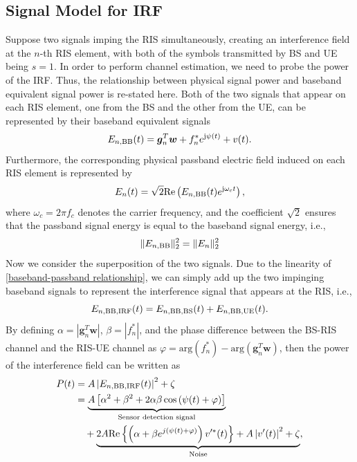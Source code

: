\documentclass[12pt,draftclsnofoot,journal,onecolumn]{IEEEtran}
\theoremstyle{nonumberplain}
\def \arg {\text{arg}}
\begin{document}
\subsection{Signal Model for IRF}
\label{Models for IRFs}
    Suppose two signals imping the RIS simultaneously, creating an interference field at the $n$-th RIS element, with both of the symbols transmitted by \ac{BS} and \ac{UE} being $s=1$. In order to perform channel estimation, we need to probe the power of the \ac{IRF}. Thus, the relationship between physical signal power and baseband equivalent signal power is re-stated here. Both of the two signals that appear on each RIS element, one from the \ac{BS} and the other from the \ac{UE}, can be represented by their baseband equivalent signals
    \begin{equation}
    \label{interference}
    E_{n,{\rm BB}}(t)=\bm g_{n}^{T}\bm w+f_{n}^{*}e^{{\rm j}\psi (t)}+v(t).
    \end{equation}
    Furthermore, the corresponding physical passband electric field induced on each RIS element is represented by 
    \begin{equation}
        E_{n}(t) = \sqrt{2} {\rm Re}\left( E_{n,{\rm BB}}(t)e^{{\rm j}\omega_c t} \right),
        \label{baseband-passband relationship}
    \end{equation}
    where $\omega_c = 2\pi f_c$ denotes the carrier frequency, and the coefficient $\sqrt{2}$ ensures that the passband signal energy is equal to the baseband signal energy, i.e., 
    \begin{equation}
        \lVert E_{n, {\rm BB}}\rVert_2^2 = \lVert E_{n}\rVert_2^2
    \end{equation}
    Now we consider the superposition of the two signals. Due to the linearity of \eqref{baseband-passband relationship}, we can simply add up the two impinging baseband signals to represent the interference signal that appears at the RIS, i.e., 
    \begin{equation}
        E_{n,{\rm BB, IRF}}(t) = E_{n, {\rm BB, BS}}(t)+E_{n,{\rm BB, UE}}(t).
    \end{equation}
    By defining $\alpha = \left\vert\bm g_{n}^{T}\bm w\right\vert$, $\beta = \left\vert f_{n}^{*}\right \vert$, and the phase difference between the \ac{BS}-\ac{RIS} channel and the \ac{RIS}-\ac{UE} channel as $\varphi = \arg\left(f_{n}^{*}\right)-\arg\left(\bm g_{n}^{T}\bm w\right)$, then the power of the interference field can be written as
    \begin{equation}
        \label{eqn:power of interference}
        \begin{aligned}
            P(t)&=A \left| E_{n, {\rm BB, IRF}} (t)\right |^{2}+\zeta\\
            &=\underbrace{A\left[\alpha^{2}+\beta^{2}+2\alpha\beta\cos\left(\psi(t)+\varphi\right)\right]}_{\text{Sensor detection signal}}\\
            &~~~+\underbrace{2A\text{Re}\left\{\left(\alpha+\beta e^{j\left(\psi(t)+\varphi\right)}\right)v'^{*}(t)\right\}+A\left|v'(t)\right|^{2}+\zeta}_{\text{Noise}},\\
        \end{aligned}
    \end{equation}
\end{document}
